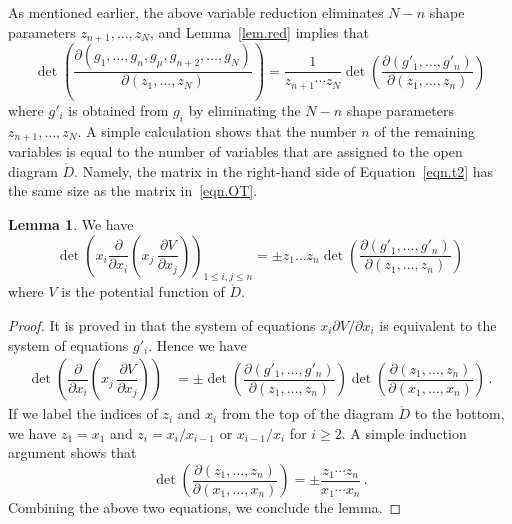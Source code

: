 \documentclass[12pt,reqno]{amsart}
\theoremstyle{definition}
\newtheorem{lemma}[theorem]{Lemma}
\renewcommand{\Ddot}{\mathring{D}}
\begin{document}
As mentioned earlier, the above variable reduction eliminates $N-n$ shape parameters
$z_{n+1},\ldots,z_N$, and Lemma~\ref{lem.red} implies that
\begin{equation}
\label{eqn.t2}
\det \left(\dfrac{\partial (g_1,\ldots, g_{n}, g_\mu,g_{n+2},\ldots,g_N)}
  {\partial (z_1,\ldots,z_N)} \right)  = \frac{1}{z_{n+1} \cdots z_N} \det
\left(\dfrac{\partial (g'_1,\ldots, g'_{n})}{\partial (z_1,\ldots,z_{n})} \right) 
\end{equation}
where $g'_i$ is obtained from $g_i$ by eliminating the $N-n$ shape parameters
$z_{n+1},\ldots,z_N$. A simple calculation shows that the number $n$ of the remaining
variables is equal to the number of variables that are assigned to the open diagram
$\Ddot$. Namely, the matrix in the right-hand side of Equation~\eqref{eqn.t2} has
the same size as the matrix in~\eqref{eqn.OT}.

\begin{lemma} 
\label{lem.cc}
We have 
\begin{equation*}
\det \left ( x_i \dfrac{\partial}{\partial x_i} \left(x_j\, \dfrac{\partial V}{
\partial x_j} \right)\right)_{1 \leq i,j \leq n} = \pm z_1 \ldots z_{n} \det
\left(\dfrac{\partial (g'_1,\ldots, g'_{n})}{\partial (z_1,\ldots,z_{n})} \right) 
\end{equation*}
where $V$ is the potential function of $\Ddot$.
\end{lemma}

\begin{proof}
It is proved in \cite[Theorem~4.1]{MY2018} that the system of equations
$x_i \partial V / \partial x_i$ is equivalent to the system of equations $g'_i$.
Hence we have
\begin{align*}
\det \left (\dfrac{\partial}{\partial x_i} \left(x_j\,
\dfrac{\partial V}{ \partial x_j} \right)\right) &= \pm \det
\left(\dfrac{\partial (g'_1,\ldots, g'_{n})}{\partial (z_1,\ldots,z_{n})} \right)
\det \left(\dfrac{\partial (z_1,\ldots, z_{n})}{\partial (x_1,\ldots,x_{n})} \right) \,.
\end{align*}
If we label the indices of $z_i$ and $x_i$ from the top of the diagram $\Ddot$ to the
bottom, we have $z_1 =x_1$ and $z_i = x_{i}/x_{i-1}$ or $x_{i-1}/x_{i}$ for $i \geq 2$.
A simple induction argument shows that
\begin{equation*}
\det \left(\dfrac{\partial (z_1,\ldots, z_{n})}{\partial (x_1,\ldots,x_{n})} \right)
= \pm  \frac{z_1 \cdots z_n}{x_1 \cdots x_n} \,.
\end{equation*}
Combining the above two equations, we conclude the lemma.
\end{proof}
\end{document}
